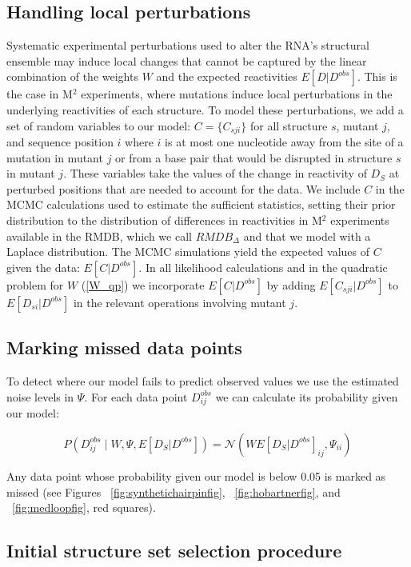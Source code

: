 \documentclass[12pt]{article}
\begin{document}
\subsection{Handling local perturbations}

Systematic experimental perturbations used to alter the RNA's structural ensemble may induce local changes that cannot be captured by the linear combination of the weights $W$ and the expected reactivities $E[D|D^{obs}]$. This is the case in M$^2$ experiments, where mutations induce local perturbations in the underlying reactivities of each structure. To model these perturbations, we add a set of random variables to our model: $C = \{ C_{sji} \}$ for all structure $s$, mutant $j$, and sequence position $i$ where $i$ is at most one nucleotide away from the site of a mutation in mutant $j$ or from a base pair that would be disrupted in structure $s$ in mutant $j$. These variables take the values of the change in reactivity of $D_S$ at perturbed positions that are needed to account for the data. We include $C$ in the MCMC calculations used to estimate the sufficient statistics, setting their prior distribution to the distribution of differences in reactivities in M$^2$ experiments available in the RMDB, which we call $RMDB_{\Delta}$ and that we model with a Laplace distribution. The MCMC simulations yield the expected values of $C$ given the data: $E[C|D^{obs}]$. In all likelihood calculations and in the quadratic problem for $W$ (\ref{W_qp}) we incorporate $E[C|D^{obs}]$ by adding $E[C_{sji}|D^{obs}]$ to  $E[D_{si}|D^{obs}]$ in the relevant operations involving mutant $j$.

\subsection{Marking missed data points}
To detect where our model fails to predict observed values we use the estimated noise levels in $\Psi$. For each data point $D^{obs}_{ij}$ we can calculate its probability given our model: 

\[P(D^{obs}_{ij} \mid W,\Psi,E[D_S|D^{obs}]) = \mathcal{N}(WE[D_S|D^{obs}]_{ij},\Psi_{ii})\]

Any data point whose probability given our model is below 0.05 is marked as missed (see Figures ~\ref{fig:synthetichairpinfig}, ~\ref{fig:hobartnerfig}, and ~\ref{fig:medloopfig}, red squares).

\subsection{Initial structure set selection procedure}
\end{document}
